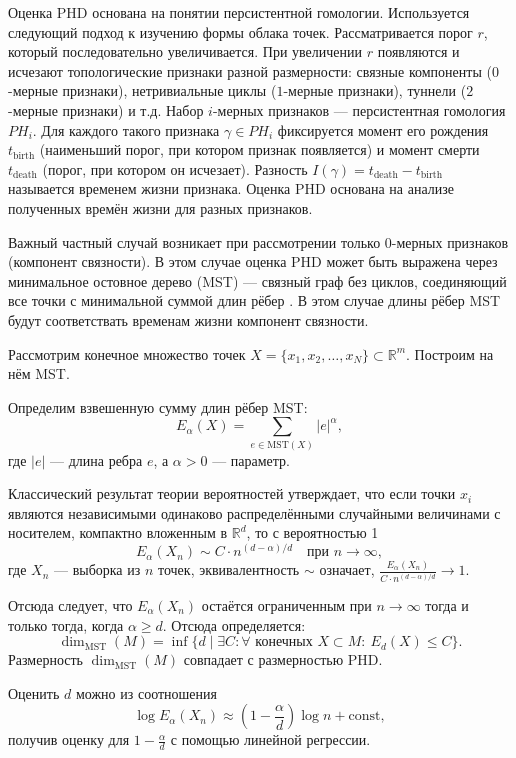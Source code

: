 \documentclass{article}
\begin{document}
Оценка PHD основана на понятии персистентной гомологии. Используется следующий подход к изучению формы облака точек. Рассматривается порог $r$, который последовательно увеличивается. При увеличении $r$ появляются и исчезают топологические признаки разной размерности: связные компоненты ($0$-мерные признаки), нетривиальные циклы ($1$-мерные признаки), туннели ($2$-мерные признаки) и т.д. Набор $i$-мерных признаков --- персистентная гомология $PH_i$. Для каждого такого признака $\gamma \in PH_i$ фиксируется момент его рождения $t_{\text{birth}}$ (наименьший порог, при котором признак появляется) и момент смерти $t_{\text{death}}$ (порог, при котором он исчезает). Разность $I(\gamma) = t_{\text{death}} - t_{\text{birth}}$ называется временем жизни признака. Оценка PHD основана на анализе полученных времён жизни для разных признаков.

Важный частный случай возникает при рассмотрении только 0-мерных признаков (компонент связности). В этом случае оценка PHD может быть выражена через минимальное остовное дерево (MST) --- связный граф без циклов, соединяющий все точки с минимальной суммой длин рёбер \cite{tulchinskii2023intrinsicdimensionestimationrobust}. В этом случае длины рёбер MST будут соответствать временам жизни компонент связности. 

Рассмотрим конечное множество точек $X = \{x_1, x_2, \dots, x_N \} \subset \mathbb{R}^m$. Построим на нём MST.

Определим взвешенную сумму длин рёбер MST:
$$E_\alpha(X) = \sum_{e \in \mathrm{MST}(X)} |e|^\alpha,$$
где $|e|$ --- длина ребра $e$, а $\alpha > 0$ --- параметр.

Классический результат теории вероятностей \cite{Steele1988} утверждает, что если точки $x_i$ являются независимыми одинаково распределёнными случайными величинами с носителем, компактно вложенным в $\mathbb{R}^d$, то с вероятностью 1
$$E_\alpha(X_n) \sim C \cdot n^{(d-\alpha)/d} \quad \text{при } n \to \infty,$$
где $X_n$ --- выборка из $n$ точек, эквивалентность $\sim$ означает, $\frac{E_\alpha(X_n)}{C \cdot n^{(d-\alpha)/d}} \to 1$.

Отсюда следует, что $E_\alpha(X_n)$ остаётся ограниченным при $n \to \infty$ тогда и только тогда, когда $\alpha \ge d$. Отсюда определяется:
$$\dim_{\mathrm{MST}}(M) = \inf \{ d \mid \exists C: \forall \text{ конечных } X \subset M: ~E_d(X) \le C\}.$$
Размерность $\dim_{\mathrm{MST}}(M)$ совпадает с размерностью PHD.

Оценить $d$ можно из соотношения
$$\log E_\alpha(X_{n}) \approx \left(1 - \frac{\alpha}{d}\right) \log n + \text{const},$$
получив оценку для $1 - \frac{\alpha}{d}$ с помощью линейной регрессии. 
\end{document}
